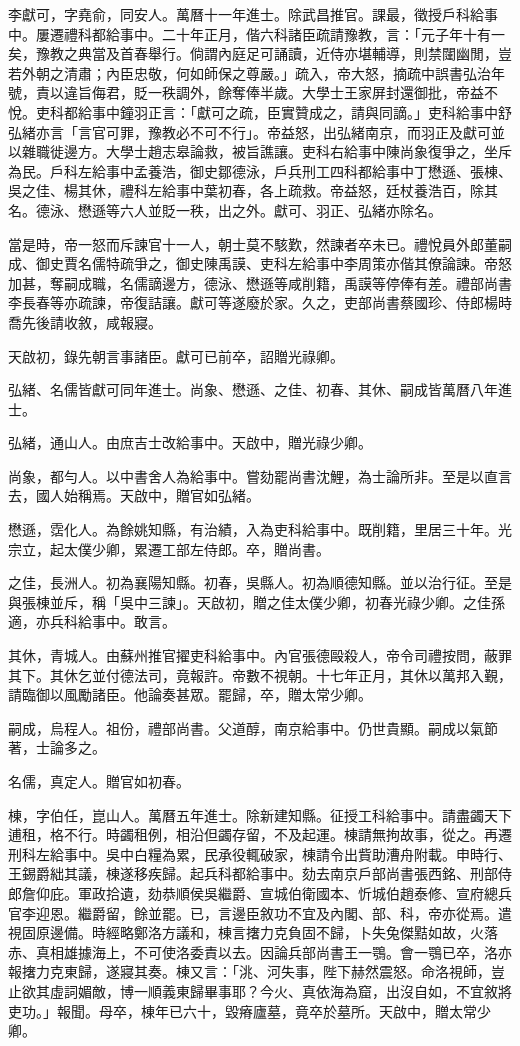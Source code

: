 \begin{pinyinscope}
李獻可，字堯俞，同安人。萬曆十一年進士。除武昌推官。課最，徵授戶科給事中。屢遷禮科都給事中。二十年正月，偕六科諸臣疏請豫教，言：「元子年十有一矣，豫教之典當及首春舉行。倘謂內庭足可誦讀，近侍亦堪輔導，則禁闥幽閒，豈若外朝之清肅；內臣忠敬，何如師保之尊嚴。」疏入，帝大怒，摘疏中誤書弘治年號，責以違旨侮君，貶一秩調外，餘奪俸半歲。大學士王家屏封還御批，帝益不悅。吏科都給事中鐘羽正言：「獻可之疏，臣實贊成之，請與同謫。」吏科給事中舒弘緒亦言「言官可罪，豫教必不可不行」。帝益怒，出弘緒南京，而羽正及獻可並以雜職徙邊方。大學士趙志皋論救，被旨譙讓。吏科右給事中陳尚象復爭之，坐斥為民。戶科左給事中孟養浩，御史鄒德泳，戶兵刑工四科都給事中丁懋遜、張棟、吳之佳、楊其休，禮科左給事中葉初春，各上疏救。帝益怒，廷杖養浩百，除其名。德泳、懋遜等六人並貶一秩，出之外。獻可、羽正、弘緒亦除名。

當是時，帝一怒而斥諫官十一人，朝士莫不駭歎，然諫者卒未已。禮悅員外郎董嗣成、御史賈名儒特疏爭之，御史陳禹謨、吏科左給事中李周策亦偕其僚論諫。帝怒加甚，奪嗣成職，名儒謫邊方，德泳、懋遜等咸削籍，禹謨等停俸有差。禮部尚書李長春等亦疏諫，帝復詰讓。獻可等遂廢於家。久之，吏部尚書蔡國珍、侍郎楊時喬先後請收敘，咸報寢。

天啟初，錄先朝言事諸臣。獻可已前卒，詔贈光祿卿。

弘緒、名儒皆獻可同年進士。尚象、懋遜、之佳、初春、其休、嗣成皆萬曆八年進士。

弘緒，通山人。由庶吉士改給事中。天啟中，贈光祿少卿。

尚象，都勻人。以中書舍人為給事中。嘗劾罷尚書沈鯉，為士論所非。至是以直言去，國人始稱焉。天啟中，贈官如弘緒。

懋遜，霑化人。為餘姚知縣，有治績，入為吏科給事中。既削籍，里居三十年。光宗立，起太僕少卿，累遷工部左侍郎。卒，贈尚書。

之佳，長洲人。初為襄陽知縣。初春，吳縣人。初為順德知縣。並以治行征。至是與張棟並斥，稱「吳中三諫」。天啟初，贈之佳太僕少卿，初春光祿少卿。之佳孫適，亦兵科給事中。敢言。

其休，青城人。由蘇州推官擢吏科給事中。內官張德毆殺人，帝令司禮按問，蔽罪其下。其休乞並付德法司，竟報許。帝數不視朝。十七年正月，其休以萬邦入覲，請臨御以風勵諸臣。他論奏甚眾。罷歸，卒，贈太常少卿。

嗣成，烏程人。祖份，禮部尚書。父道醇，南京給事中。仍世貴顯。嗣成以氣節著，士論多之。

名儒，真定人。贈官如初春。

棟，字伯任，崑山人。萬曆五年進士。除新建知縣。征授工科給事中。請盡蠲天下逋租，格不行。時蠲租例，相沿但蠲存留，不及起運。棟請無拘故事，從之。再遷刑科左給事中。吳中白糧為累，民承役輒破家，棟請令出貲助漕舟附載。申時行、王錫爵絀其議，棟遂移疾歸。起兵科都給事中。劾去南京戶部尚書張西銘、刑部侍郎詹仰庇。軍政拾遺，劾恭順侯吳繼爵、宣城伯衛國本、忻城伯趙泰修、宣府總兵官李迎恩。繼爵留，餘並罷。已，言邊臣敘功不宜及內閣、部、科，帝亦從焉。遣視固原邊備。時經略鄭洛方議和，棟言撦力克負固不歸，卜失兔傑黠如故，火落赤、真相雄據海上，不可使洛委責以去。因論兵部尚書王一鶚。會一鶚已卒，洛亦報撦力克東歸，遂寢其奏。棟又言：「洮、河失事，陛下赫然震怒。命洛視師，豈止欲其虛詞媚敵，博一順義東歸畢事耶？今火、真依海為窟，出沒自如，不宜敘將吏功。」報聞。母卒，棟年已六十，毀瘠廬墓，竟卒於墓所。天啟中，贈太常少卿。


\end{pinyinscope}
